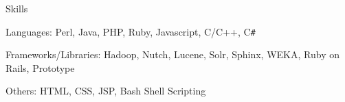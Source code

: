 \documentclass{resume}
\begin{document}
\begin{category}{Skills}{}

    \item {\topic Languages:} Perl, Java, PHP, Ruby, Javascript, C/C++, C{\tt \#}

    \item {\topic Frameworks/Libraries:} Hadoop, Nutch, Lucene, Solr, Sphinx,
        WEKA, Ruby on Rails, Prototype

    \item {\topic Others:} HTML, CSS, JSP, Bash Shell Scripting

\end{category}


\end{document}
